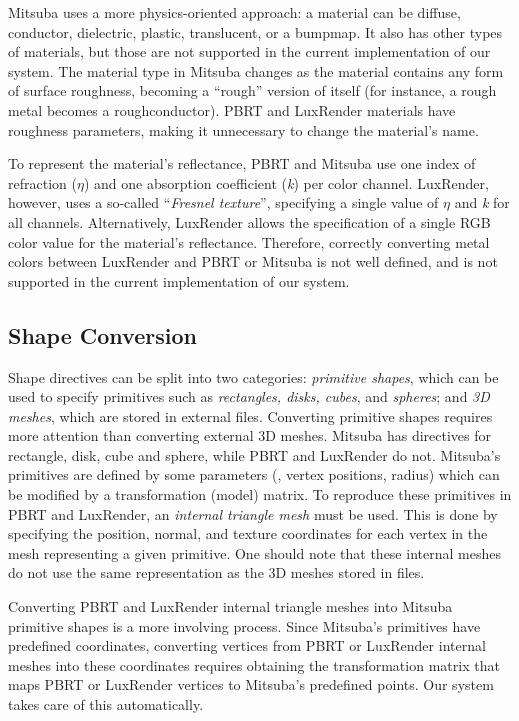 Mitsuba uses a more physics-oriented approach: a material can be diffuse, conductor, dielectric, plastic, translucent, or a bumpmap. It also has other types of materials, but those are not supported in the current implementation of our system. The material type in Mitsuba changes as the material contains any form of surface roughness, becoming a ``rough'' version of itself (for instance, a rough metal becomes a roughconductor). PBRT and LuxRender materials have roughness parameters, making it unnecessary to change the material's name.

To represent the material's reflectance, PBRT and Mitsuba use one index of refraction ($\eta$) and one absorption coefficient (\textit{k}) per color channel. LuxRender, however, uses a so-called ``{\it Fresnel texture}'', specifying a single value of $\eta$ and \textit{k} for all channels. Alternatively, LuxRender allows the specification of a single RGB color value for the material's reflectance. Therefore, correctly converting metal colors between LuxRender and PBRT or Mitsuba is not well defined, and is not supported in the current implementation of our system.

\subsection{Shape Conversion}
Shape directives can be split into two categories: {\it primitive shapes}, which can be used to specify primitives such as {\it rectangles, disks, cubes}, and {\it spheres}; and {\it 3D meshes}, which are stored in external files. Converting primitive shapes requires more attention than converting external 3D meshes. Mitsuba has directives for rectangle, disk, cube and sphere, while PBRT and LuxRender do not. Mitsuba's primitives are defined by some parameters (\eg, vertex positions, radius) which can be modified by a transformation (model) matrix. To reproduce these primitives in PBRT and LuxRender, an {\it internal triangle mesh} must be used. This is done by specifying the position, normal, and texture coordinates for each vertex in the mesh representing a given primitive. One should note that these internal meshes do not use the same representation as the 3D meshes stored in files.

Converting PBRT and LuxRender internal triangle meshes into Mitsuba primitive shapes is a more involving process. Since Mitsuba's primitives have predefined coordinates, converting vertices from PBRT or LuxRender internal meshes into these coordinates requires obtaining the transformation matrix that maps PBRT or LuxRender vertices to Mitsuba's predefined points. Our system takes care of this automatically.

